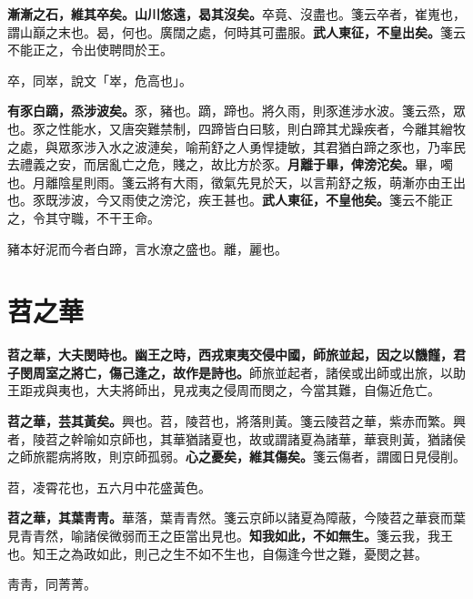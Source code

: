 \textbf{漸漸之石，維其卒矣。山川悠遠，曷其沒矣。}{\footnotesize 卒竟、沒盡也。箋云卒者，崔嵬也，謂山巔之末也。曷，何也。廣闊之處，何時其可盡服。}\textbf{武人東征，不皇出矣。}{\footnotesize 箋云不能正之，令出使聘問於王。}

\begin{quoting}卒，同崒，說文「崒，危高也」。\end{quoting}

\textbf{有豕白蹢，烝涉波矣。}{\footnotesize 豕，豬也。蹢，蹄也。將久雨，則豕進涉水波。箋云烝，眾也。豕之性能水，又唐突難禁制，四蹄皆白曰駭，則白蹄其尤躁疾者，今離其繒牧之處，與眾豕涉入水之波漣矣，喻荊舒之人勇悍捷敏，其君猶白蹄之豕也，乃率民去禮義之安，而居亂亡之危，賤之，故比方於豕。}\textbf{月離于畢，俾滂沱矣。}{\footnotesize 畢，噣也。月離陰星則雨。箋云將有大雨，徵氣先見於天，以言荊舒之叛，萌漸亦由王出也。豕既涉波，今又雨使之滂沱，疾王甚也。}\textbf{武人東征，不皇他矣。}{\footnotesize 箋云不能正之，令其守職，不干王命。}

\begin{quoting}豬本好泥而今者白蹄，言水潦之盛也。離，麗也。\end{quoting}

\section{苕之華}


\textbf{苕之華，大夫閔時也。幽王之時，西戎東夷交侵中國，師旅並起，因之以饑饉，君子閔周室之將亡，傷己逢之，故作是詩也。}{\footnotesize 師旅並起者，諸侯或出師或出旅，以助王距戎與夷也，大夫將師出，見戎夷之侵周而閔之，今當其難，自傷近危亡。}

\textbf{苕之華，芸其黃矣。}{\footnotesize 興也。苕，陵苕也，將落則黃。箋云陵苕之華，紫赤而繁。興者，陵苕之幹喻如京師也，其華猶諸夏也，故或謂諸夏為諸華，華衰則黃，猶諸侯之師旅罷病將敗，則京師孤弱。}\textbf{心之憂矣，維其傷矣。}{\footnotesize 箋云傷者，謂國日見侵削。}

\begin{quoting}苕，凌霄花也，五六月中花盛黃色。\end{quoting}

\textbf{苕之華，其葉靑靑。}{\footnotesize 華落，葉青青然。箋云京師以諸夏為障蔽，今陵苕之華衰而葉見青青然，喻諸侯微弱而王之臣當出見也。}\textbf{知我如此，不如無生。}{\footnotesize 箋云我，我王也。知王之為政如此，則己之生不如不生也，自傷逢今世之難，憂閔之甚。}

\begin{quoting}靑靑，同菁菁。\end{quoting}

